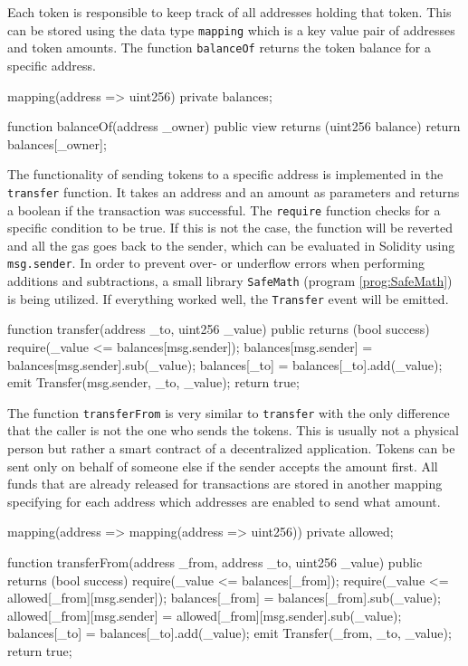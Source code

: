 Each token is responsible to keep track of all addresses holding that token. This can be stored using the data type \texttt{mapping} which is a key value pair of addresses and token amounts. The function \texttt{balanceOf} returns the token balance for a specific address.

\begin{GenericCode}
 mapping(address => uint256) private balances;
  
 function balanceOf(address _owner) public view returns (uint256 balance) {
   return balances[_owner];
 }
\end{GenericCode}

The functionality of sending tokens to a specific address is implemented in the \texttt{transfer} function. It takes an address and an amount as parameters and returns a boolean if the transaction was successful. The \texttt{require} function checks for a specific condition to be true. If this is not the case, the function will be reverted and all the gas goes back to the sender, which can be evaluated in Solidity using \texttt{msg.sender}. In order to prevent over- or underflow errors when performing additions and subtractions, a small library \texttt{SafeMath} (program \ref{prog:SafeMath}) is being utilized. If everything worked well, the \texttt{Transfer} event will be emitted.

\begin{GenericCode}
function transfer(address _to, uint256 _value) public returns (bool success) {
  require(_value <= balances[msg.sender]);
  balances[msg.sender] = balances[msg.sender].sub(_value);
  balances[_to] = balances[_to].add(_value);
  emit Transfer(msg.sender, _to, _value);
  return true;
}
\end{GenericCode}

The function \texttt{transferFrom} is very similar to \texttt{transfer} with the only difference that the caller is not the one who sends the tokens. This is usually not a physical person but rather a smart contract of a decentralized application. Tokens can be sent only on behalf of someone else if the sender accepts the amount first. All funds that are already released for transactions are stored in another mapping specifying for each address which addresses are enabled to send what amount.

\begin{GenericCode}
mapping(address => mapping(address => uint256)) private allowed;

function transferFrom(address _from, address _to, uint256 _value) public returns (bool success) {
  require(_value <= balances[_from]);
  require(_value <= allowed[_from][msg.sender]);
  balances[_from] = balances[_from].sub(_value);
  allowed[_from][msg.sender] = allowed[_from][msg.sender].sub(_value);
  balances[_to] = balances[_to].add(_value);
  emit Transfer(_from, _to, _value);
  return true;
}
\end{GenericCode}

